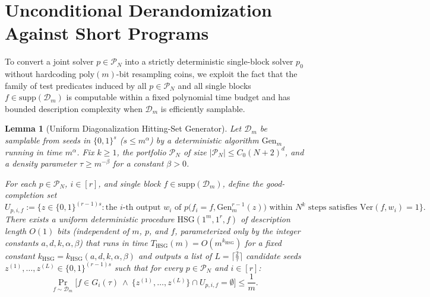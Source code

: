 \documentclass[11pt]{article}
\newtheorem{lemma}[theorem]{Lemma}
\begin{document}
\section{Unconditional Derandomization Against Short Programs}

To convert a joint solver $p \in \mathcal{P}_N$ into a strictly deterministic single-block solver $p_0$ without hardcoding $\mathrm{poly}(m)$-bit resampling coins, we exploit the fact that the family of test predicates induced by all $p \in \mathcal{P}_N$ and all single blocks $f \in \mathrm{supp}(\mathcal{D}_m)$ is computable within a fixed polynomial time budget and has bounded description complexity when $\mathcal{D}_m$ is efficiently samplable.

\begin{lemma}[Uniform Diagonalization Hitting-Set Generator]\label{lem:hsg}
Let $\mathcal{D}_m$ be samplable from seeds in $\{0,1\}^s$ ($s \le m^\alpha$) by a deterministic algorithm $\mathrm{Gen}_m$ running in time $m^\alpha$. Fix $k \ge 1$, the portfolio $\mathcal{P}_N$ of size $|\mathcal{P}_N| \le C_0 (N+2)^d$, and a density parameter $\tau \ge m^{-\beta}$ for a constant $\beta > 0$.

For each $p \in \mathcal{P}_N$, $i \in [r]$, and single block $f \in \mathrm{supp}(\mathcal{D}_m)$, define the good-completion set
\[
  U_{p,i,f} := \Big\{ z \in \{0,1\}^{(r-1)s} : \text{the } i\text{-th output } w_i \text{ of } p\big(f_i = f, \mathrm{Gen}_m^{r-1}(z)\big) \text{ within } N^k \text{ steps satisfies } \mathrm{Ver}(f, w_i) = 1 \Big\}.
\]
There exists a uniform deterministic procedure $\mathrm{HSG}(1^m, 1^r, f)$ of description length $O(1)$ bits (independent of $m$, $p$, and $f$, parameterized only by the integer constants $a, d, k, \alpha, \beta$) that runs in time $T_{\mathrm{HSG}}(m) = O(m^{k_{\mathrm{HSG}}})$ for a fixed constant $k_{\mathrm{HSG}} = k_{\mathrm{HSG}}(a,d,k,\alpha,\beta)$ and outputs a list of $L = \lceil \frac{2}{\tau} \rceil$ candidate seeds $z^{(1)}, \dots, z^{(L)} \in \{0,1\}^{(r-1)s}$ such that for every $p \in \mathcal{P}_N$ and $i \in [r]$:
\[
  \Pr_{f \sim \mathcal{D}_m}\Big[ f \in G_i(\tau) \ \wedge\ \big\{z^{(1)},\dots,z^{(L)}\big\} \cap U_{p,i,f} = \emptyset \Big] \le \frac{1}{m}.
\]
\end{lemma}
\end{document}
